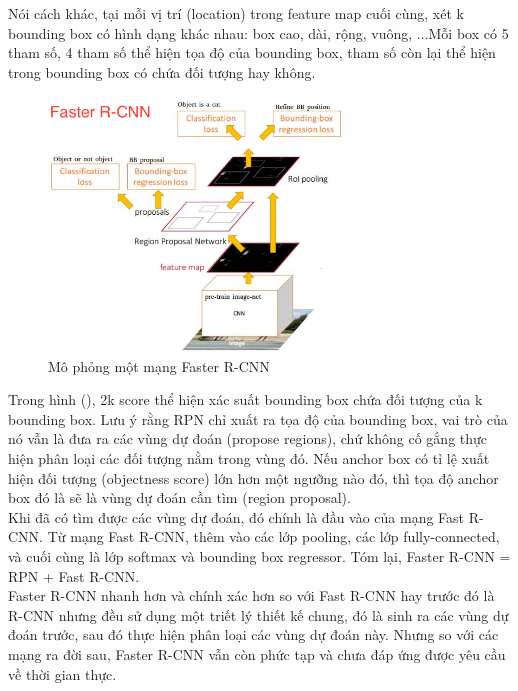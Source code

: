 \documentclass[a4paper]{report}
\begin{document}
Nói cách khác, tại mỗi vị trí (location) trong feature map cuối cùng, xét k bounding box 
có hình dạng khác nhau: box cao, dài, rộng, vuông, ...Mỗi box có 5 tham số, 4 tham số thể 
hiện tọa độ của bounding box, tham số còn lại thể hiện trong bounding box có chứa đối 
tượng hay không.\\

\begin{figure}[h!]
	\centering
	\includegraphics[width=0.7\textwidth]{2_faster.png}
	\caption[Caption for LOF]{Mô phỏng một mạng Faster R-CNN \cite{detectionoverview}} 
\end{figure}

Trong hình (), 2k score thể hiện xác suất bounding box chứa đối tượng của k bounding box.
Lưu ý rằng RPN chỉ xuất ra tọa độ của bounding box, vai trò của nó vẫn là đưa ra các vùng 
dự đoán (propose regions), chứ không cố gắng thực hiện phân loại các đối tượng nằm trong 
vùng đó. Nếu anchor box có tỉ lệ xuất hiện đối tượng (objectness score) lớn hơn một ngưỡng 
nào đó, thì tọa độ anchor box đó là sẽ là vùng dự đoán cần tìm (region proposal). \\
 
Khi đã có tìm được các vùng dự đoán, đó chính là đầu vào của mạng Fast R-CNN. Từ mạng 
Fast R-CNN, thêm vào các lớp pooling, các lớp fully-connected, và cuối cùng là lớp softmax
 và bounding box regressor. Tóm lại, Faster R-CNN = RPN + Fast R-CNN.\\

 
Faster R-CNN nhanh hơn và chính xác hơn so với Fast R-CNN hay trước đó là R-CNN
 nhưng đều sử dụng một triết lý thiết kế chung, đó là sinh ra các vùng dự đoán 
 trước, sau đó thực hiện phân loại các vùng dự đoán này. Nhưng so với các mạng 
 ra đời sau, Faster R-CNN vẫn còn phức tạp và chưa đáp ứng được yêu cầu về thời gian thực. 
\end{document}
